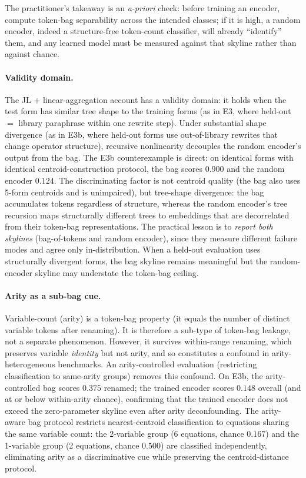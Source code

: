 The practitioner's takeaway is an \emph{a-priori} check: before training an encoder, compute token-bag separability across the intended classes; if it is high, a random encoder, indeed a structure-free token-count classifier, will already ``identify'' them, and any learned model must be measured against that skyline rather than against chance.

\paragraph{Validity domain.} The JL + linear-aggregation account has a validity domain: it holds when the test form has similar tree shape to the training forms (as in E3, where held-out $=$ library paraphrase within one rewrite step). Under substantial shape divergence (as in E3b, where held-out forms use out-of-library rewrites that change operator structure), recursive nonlinearity decouples the random encoder's output from the bag. The E3b counterexample is direct: on identical forms with identical centroid-construction protocol, the bag scores $0.900$ and the random encoder $0.124$. The discriminating factor is not centroid quality (the bag also uses 5-form centroids and is unimpaired), but tree-shape divergence: the bag accumulates tokens regardless of structure, whereas the random encoder's tree recursion maps structurally different trees to embeddings that are decorrelated from their token-bag representations. The practical lesson is to \emph{report both skylines} (bag-of-tokens and random encoder), since they measure different failure modes and agree only in-distribution. When a held-out evaluation uses structurally divergent forms, the bag skyline remains meaningful but the random-encoder skyline may understate the token-bag ceiling.

\paragraph{Arity as a sub-bag cue.} Variable-count (arity) is a token-bag property (it equals the number of distinct variable tokens after renaming). It is therefore a sub-type of token-bag leakage, not a separate phenomenon. However, it survives within-range renaming, which preserves variable \emph{identity} but not arity, and so constitutes a confound in arity-heterogeneous benchmarks. An arity-controlled evaluation (restricting classification to same-arity groups) removes this confound. On E3b, the arity-controlled bag scores $0.375$ renamed; the trained encoder scores $0.148$ overall (and at or below within-arity chance), confirming that the trained encoder does not exceed the zero-parameter skyline even after arity deconfounding. The arity-aware bag protocol restricts nearest-centroid classification to equations sharing the same variable count: the 2-variable group (6 equations, chance $0.167$) and the 1-variable group (2 equations, chance $0.500$) are classified independently, eliminating arity as a discriminative cue while preserving the centroid-distance protocol.


